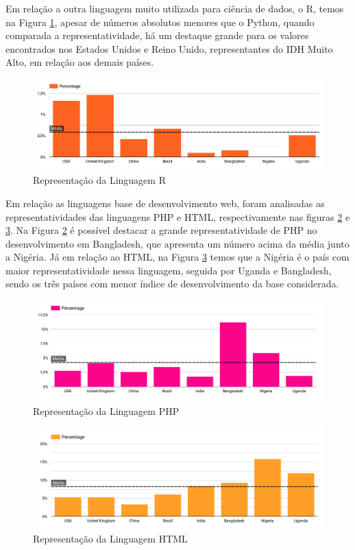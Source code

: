 \documentclass[12pt]{article}
\begin{document}
Em relação a outra linguagem muito utilizada para ciência de dados, o R, temos na Figura \ref{fig:r}, apesar de números absolutos menores que o Python, quando comparada a representatividade, há um destaque  grande para os valores encontrados nos Estados Unidos e Reino Unido, representantes do IDH Muito Alto, em relação aos demais países. 

\begin{figure}[H]
\centering
\includegraphics[width=1\textwidth]{img/rq1/r.png}
\caption{Representação da Linguagem R}
\label{fig:r}
\end{figure}

Em relação as linguagens base de desenvolvimento web, foram analisadas as representatividades das linguagens PHP e HTML, respectivamente nas figuras \ref{fig:php} e \ref{fig:html}. Na Figura \ref{fig:php} é possível destacar a grande representatividade de PHP no desenvolvimento em Bangladesh, que apresenta um número acima da média junto a Nigéria. Já em relação ao HTML, na Figura \ref{fig:html} temos que a Nigéria é o país com maior representatividade nessa linguagem, seguida por Uganda e Bangladesh, sendo os três países com menor índice de desenvolvimento da base considerada.

\begin{figure}[H]
\centering
\includegraphics[width=1\textwidth]{img/rq1/php.png}
\caption{Representação da Linguagem PHP}
\label{fig:php}
\end{figure}

\begin{figure}[H]
\centering
\includegraphics[width=1\textwidth]{img/rq1/html.png}
\caption{Representação da Linguagem HTML}
\label{fig:html}
\end{figure}
\end{document}
